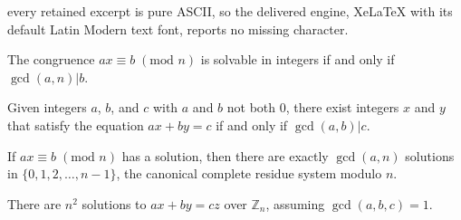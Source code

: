 \documentclass[10pt,a4paper]{amsart}
\newcommand{\Z}{\mathbb{Z}}
\renewcommand{\mod}[1]{\;(\text{mod }#1)}
\begin{document}
every retained excerpt is pure ASCII, so the delivered engine, XeLaTeX with its default Latin Modern text font, reports no missing character.
\begin{theorem}\label{thm-nt-1}
The congruence $ax \equiv b \mod{n}$ is solvable in integers if and only if $\gcd(a,n)|b$.
\end{theorem}

\begin{theorem}\label{thm-nt-2}
    Given integers $a$, $b$, and $c$ with $a$ and $b$ not both $0$, there exist integers $x$ and $y$ that satisfy the equation $ax + by  = c$ if and only if $\gcd(a,b)|c$.
\end{theorem}

\begin{theorem}\label{thm-nt-3}
If $ax \equiv b \mod{n}$ has a solution, then there are exactly $\gcd(a,n)$ solutions in $\{0, 1, 2, \ldots, n - 1\}$, the canonical complete residue system modulo $n$.
\end{theorem}

\begin{lemma}\label{lem-solns-Zn}
There are $n^2$ solutions to $ax + by = cz$ over $\Z_n$, assuming $\gcd(a,b,c) = 1$.
\end{lemma}
\end{document}
